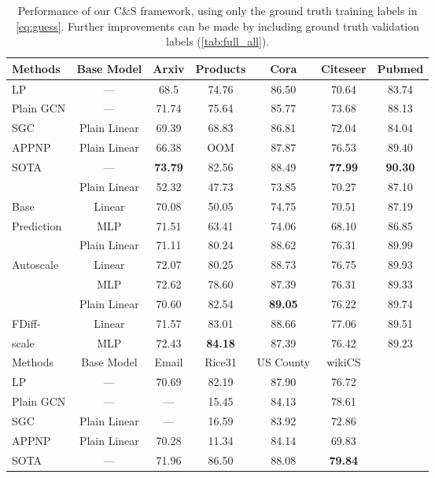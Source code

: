\documentclass{article}
\begin{document}
\begin{table}[t]
\caption{Performance of our C\&S framework, using only the ground truth training labels in \cref{eq:guess}.
Further improvements can be made by including ground truth validation labels (\cref{tab:full_all}).
}\label{tab:full}
\vspace{-\baselineskip}
\begin{center}
\begin{tabular}{lcccccc}
\toprule
Methods &  Base Model  & Arxiv & Products & Cora & Citeseer &  Pubmed\\ 
  \midrule
  LP & --- & 68.5 & 74.76  & 86.50  & 70.64 & 83.74\\
 Plain GCN & --- & 71.74 & 75.64 & 85.77 & 73.68 & 88.13 \\
 SGC & Plain Linear & 69.39  & 68.83 & 86.81 & 72.04 & 84.04 \\
 APPNP & Plain Linear & 66.38 & OOM & 87.87 & 76.53 & 89.40 \\
 SOTA  & --- & \textbf{73.79} & 82.56 & 88.49 & \textbf{77.99} & \textbf{90.30} \\
\midrule
  & Plain Linear& 52.32  & 47.73  & 73.85  & 70.27 & 87.10 \\
 Base& Linear & 70.08  & 50.05  & 74.75 & 70.51 &87.19\\
 Prediction & MLP & 71.51  & 63.41  & 74.06 & 68.10 & 86.85\\
  \midrule
 & Plain Linear& 71.11  &  80.24 & 88.62 & 76.31 &  89.99 \\
 Autoscale & Linear & 72.07  & 80.25 & 88.73 & 76.75 & 89.93\\
 & MLP &  72.62	 & 78.60 & 87.39 & 76.31 & 89.33 \\
  \midrule
& Plain Linear&   70.60	& 82.54 & \textbf{89.05} & 76.22 & 89.74\\
 FDiff-  & Linear&   71.57	& 83.01 & 88.66 & 77.06& 89.51 \\
scale& MLP&   72.43	& \textbf{84.18} & 87.39 & 76.42& 89.23 \\
\midrule
Methods &  Base Model  & Email & Rice31 &  US County & wikiCS\\ 
  \midrule
  LP & --- & 70.69  & 82.19  & 87.90  & 76.72 &  \\
 Plain GCN & --- & ---  & 15.45  & 84.13  & 78.61  \\
  SGC & Plain Linear & --- & 16.59  & 83.92  & 72.86 \\
 APPNP & Plain Linear & 70.28  & 11.34   & 84.14  & 69.83  \\
 SOTA & ---  & 71.96  & 86.50  & 88.08  & \textbf{79.84} \\

\end{tabular}
\end{center}
\end{table}
\end{document}
